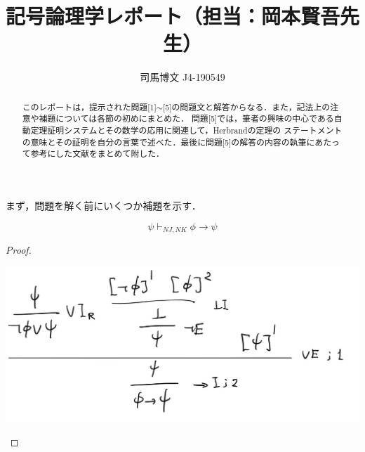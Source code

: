 \documentclass[uplatex,dvipdfmx]{jsarticle}
\title{記号論理学レポート（担当：岡本賢吾先生）}
\author{司馬博文 J4-190549}
\begin{document}
\maketitle
\begin{abstract}
    このレポートは，提示された問題[1]$\sim$[5]の問題文と解答からなる．また，記法上の注意や補題については各節の初めにまとめた．
    問題[5]では，筆者の興味の中心である自動定理証明システムとその数学の応用に関連して，Herbrandの定理の
    ステートメントの意味とその証明を自分の言葉で述べた．最後に問題[5]の解答の内容の執筆にあたって参考にした文献をまとめて附した．
\end{abstract}

\section{}

まず，問題を解く前にいくつか補題を示す．

\begin{lemma}
    \[\psi\vdash_{NJ,NK}\phi\to\psi\]
\end{lemma}
\begin{proof}\mbox{}\\
    \begin{center}
        \includegraphics[width=15cm]{figure1.jpg}
    \end{center}
\end{proof}
\end{document}
